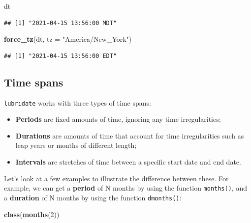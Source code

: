 \documentclass[
]{book}
\newenvironment{Shaded}{\begin{snugshade}}{\end{snugshade}}
\newcommand{\AttributeTok}[1]{\textcolor[rgb]{0.13,0.29,0.53}{#1}}
\newcommand{\DecValTok}[1]{\textcolor[rgb]{0.00,0.00,0.81}{#1}}
\newcommand{\FunctionTok}[1]{\textcolor[rgb]{0.13,0.29,0.53}{\textbf{#1}}}
\newcommand{\NormalTok}[1]{#1}
\newcommand{\StringTok}[1]{\textcolor[rgb]{0.31,0.60,0.02}{#1}}
\providecommand{\tightlist}{%
  \setlength{\itemsep}{0pt}\setlength{\parskip}{0pt}}
\begin{document}
\begin{Shaded}
\begin{Highlighting}[]
\NormalTok{dt}
\end{Highlighting}
\end{Shaded}

\begin{verbatim}
## [1] "2021-04-15 13:56:00 MDT"
\end{verbatim}

\begin{Shaded}
\begin{Highlighting}[]
\FunctionTok{force\_tz}\NormalTok{(dt, }\AttributeTok{tz =} \StringTok{"America/New\_York"}\NormalTok{)}
\end{Highlighting}
\end{Shaded}

\begin{verbatim}
## [1] "2021-04-15 13:56:00 EDT"
\end{verbatim}

\hypertarget{time-spans}{%
\subsection{Time spans}\label{time-spans}}

\texttt{lubridate} works with three types of time spans:

\begin{itemize}
\tightlist
\item
  \textbf{Periods} are fixed amounts of time, ignoring any time irregularities;
\item
  \textbf{Durations} are amounts of time that account for time irregularities such as leap years or months of different length;
\item
  \textbf{Intervals} are stretches of time between a specific start date and end date.
\end{itemize}

Let's look at a few examples to illustrate the difference between these. For example, we can get a \textbf{period} of N months by using the function \texttt{months()}, and a \textbf{duration} of N months by using the function \texttt{dmonths()}:

\begin{Shaded}
\begin{Highlighting}[]
\FunctionTok{class}\NormalTok{(}\FunctionTok{months}\NormalTok{(}\DecValTok{2}\NormalTok{))}
\end{Highlighting}
\end{Shaded}
\end{document}
